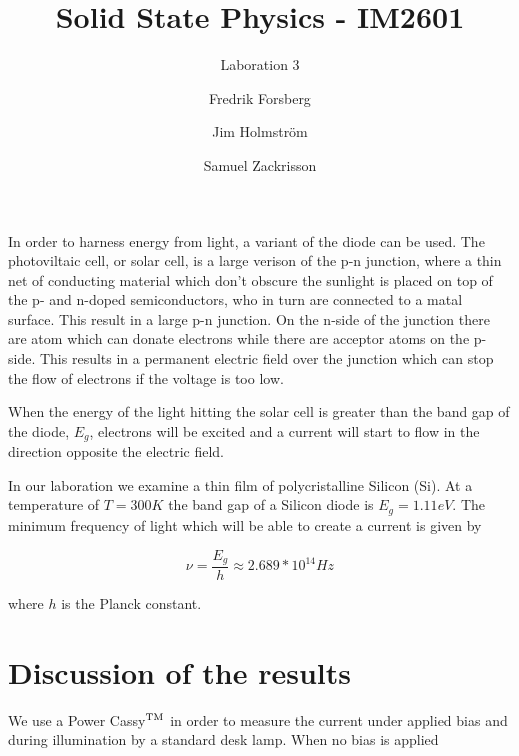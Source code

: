 \documentclass[a4paper,twoside=false,abstract=false,numbers=noenddot,
titlepage=false,headings=small,parskip=half,version=last]{scrartcl}
\title{Solid State Physics - IM2601}
\subtitle{Laboration 3}
\author[1]{Fredrik Forsberg}
\author[1]{Jim Holmström}
\author[1]{Samuel Zackrisson}
\affil[1]{Engineering Physics, Royal Institute of Technology}
\affil[1]{\{fforsber, jimho, samuelz\}@kth.se}
\begin{document}
\maketitle
\thispagestyle{empty}


In order to harness energy from light, a variant of the diode can be used. The photoviltaic cell, or solar cell, is a large verison of the p-n junction, where a thin net of conducting material which don't obscure the sunlight is placed on top of the p- and n-doped semiconductors, who in turn are connected to a matal surface. This result in a large p-n junction. On the n-side of the junction there are atom which can donate electrons while there are acceptor atoms on the p-side. This results in a permanent electric field over the junction which can stop the flow of electrons if the voltage is too low.

When the energy of the light hitting the solar cell is greater than the band gap of the diode, $E_g$, electrons will be excited and a current will start to flow in the direction opposite the electric field.



In our laboration we examine a thin film of polycristalline Silicon (Si). At a temperature of $T = 300 K$ the band gap of a Silicon diode is $E_g=1.11 eV$. The minimum frequency of light which will be able to create a current is given by

$$\nu = \frac{E_g}{h} \approx 2.689*10^{14} Hz$$

where $h$ is the Planck constant.

\section{Discussion of the results}

We use a Power Cassy$\textsuperscript{TM}$ in order to measure the current under applied bias and during illumination by a standard desk lamp. When no bias is applied 

\end{document}
